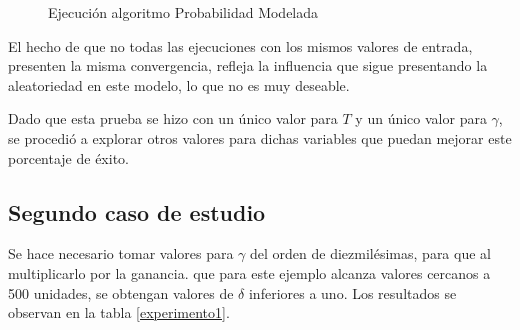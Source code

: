 \begin{figure}
\begin{subfigure}[b]{0.38\textwidth}
        \label{fig:tiger}
    \end{subfigure}    
    \caption{Ejecución algoritmo Probabilidad Modelada}
    \label{Ejecuta10}
\end{figure}

El hecho de que no todas las ejecuciones con los mismos valores de entrada, presenten la misma convergencia, refleja la influencia que sigue presentando la aleatoriedad en este modelo, lo que no es muy deseable.

Dado que esta prueba se hizo con un único valor para $T$ y un único valor para $\gamma$, se procedió a explorar otros valores para dichas variables que puedan mejorar este porcentaje de éxito.

\subsection{Segundo caso de estudio}

Se hace necesario tomar valores para $\gamma$ del orden de diezmilésimas, para que al multiplicarlo por la ganancia. que para este ejemplo alcanza valores cercanos a 500 unidades, se obtengan valores de $\delta$ inferiores a uno. Los resultados se observan en la tabla \ref{experimento1}.

